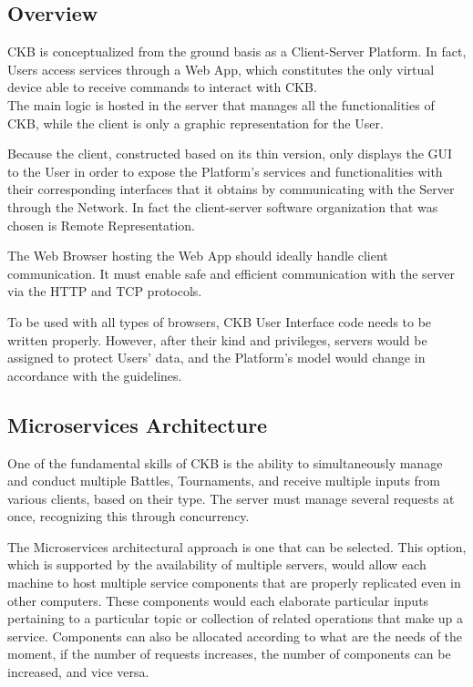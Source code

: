 \subsection{Overview}
CKB is conceptualized from the ground basis as a Client-Server Platform. In fact, Users access services through a Web App, which constitutes the only virtual device able to receive commands to interact 
with CKB.
\\
The main logic is hosted in the server that manages all the functionalities of CKB, while the client is only a graphic representation for the User.

Because the client, constructed based on its thin version, only displays the GUI to the User in order to expose the Platform's services and functionalities with their corresponding interfaces that it obtains by communicating with the Server through 
the Network. In fact the client-server software organization that was chosen is Remote Representation.

The Web Browser hosting the Web App should ideally handle client communication. It must enable safe and efficient communication with the server via the HTTP and TCP protocols. 

To be used with all types of browsers, CKB User Interface code needs to be written properly. However, after their kind and privileges, servers would be assigned to protect Users' data, and the Platform's model would change in accordance 
with the guidelines.

\subsection{Microservices Architecture}
One of the fundamental skills of CKB is the ability to simultaneously manage and conduct multiple Battles, Tournaments, and receive multiple inputs from various clients, based on their type. 
The server must manage several requests at once, recognizing this through concurrency.

The Microservices architectural approach is one that can be selected. 
This option, which is supported by the availability of multiple servers, would allow each machine to host multiple service components that are properly replicated even in other computers. 
These components would each elaborate particular inputs pertaining to a particular topic or collection of related operations that make up a service.
Components can also be allocated according to what are the needs of the moment, if the number of requests increases, the number of components can be increased, and vice versa.

